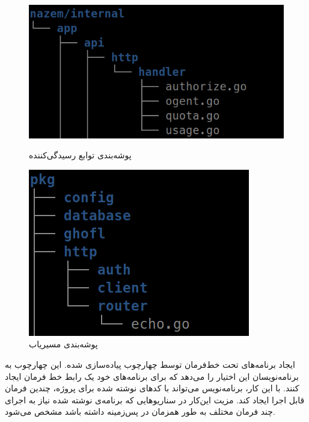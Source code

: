 \begin{figure}
	\vspace{1cm}
	\centering
	\begin{minipage}[b]{0.5\textwidth}
		\includegraphics[width=\textwidth]{figures/echo-handler-dir.png}
		\caption{پوشه‌بندی توابع رسیدگی‌کننده }
		\label{fig:echo-folder-handler}
	\end{minipage}
	\hfill
	\begin{minipage}[b]{0.4\textwidth}
		\includegraphics[width=\textwidth]{figures/echo-router-dir.png}
		\caption{پوشه‌بندی مسیریاب }
		\label{fig:echo-folder-router}
	\end{minipage}
	
\end{figure}


ایجاد برنامه‌های تحت خط‌فرمان توسط چهارچوب  پیاده‌سازی شده. این چهارچوب به برنامه‌نویسان این اختیار ‌را می‌دهد که برای برنامه‌های خود یک رابط خط فرمان ایجاد کنند. با این کار، برنامه‌نویس می‌تواند با کد‌های نوشته شده برای پروژه، چندین فرمان قابل اجرا ایجاد کند. مزیت این‌کار در سناریو‌هایی که برنامه‌ی‌ نوشته شده نیاز به اجرای چند فرمان مختلف به طور همزمان در پس‌زمینه داشته باشد مشخص می‌شود.

